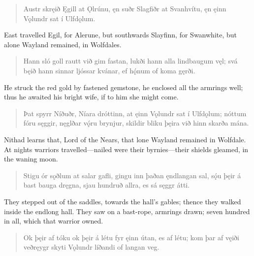 \begin{verse}
\bva Austr skręið Ęgill \hld at Ǫlrúnu,
ęn suðr Slagfiðr \hld at Svanhvítu,
ęn ęinn Vǫlundr \hld sat í Ulfdǫlum. \\%
\end{verse}

\bvb East travelled Egil, for Alerune, but southwards Slayfinn, for Swanwhite, but alone Wayland remained, in Wolfdales. \\

\begin{verse}
\bva Hann sló goll rautt \hld við gim fastan,
lukði hann alla \hld lindbaugum vęl;
svá bęið hann \hld sinnar ljóssar
kvánar, ef hǫ́num \hld of koma gęrði. \\%
\end{verse}

\bvb He struck the red gold by fastened gemstone, he enclosed all the armrings well; thus he awaited his bright wife, if to him she might come. \\

\begin{verse}
\bva Þat spyrr Níðuðr, \hld Níara dróttinn,
at ęinn Vǫlundr \hld sat í Ulfdǫlum;
nóttum fóru sęggir, \hld nęglðar vǫ́ru brynjur,
skildir bliku þęira \hld við hinn skarða mána. \\%
\end{verse}

\bvb Nithad learns that, Lord of the Nears, that lone Wayland remained in Wolfdale. At nights warriors travelled—nailed were their byrnies—their shields gleamed, in the waning moon. \\

\begin{verse}
\bva Stigu ór sǫðlum \hld at salar gafli,
gingu inn þaðan \hld ęndlangan sal,
sǫ́u þęir á bast \hld bauga dręgna,
sjau hundruð allra, \hld es sá sęggr átti. \\%
\end{verse}

\bvb They stepped out of the saddles, towards the hall's gables; thence they walked inside the endlong hall. They saw on a bast-rope, armrings drawn; seven hundred in all, which that warrior owned. \\

\begin{verse}
\bva Ok þęir af tóku \hld ok þęir á létu
fyr ęinn útan, \hld es af létu;
kom þar af vęiði \hld veðręygr skyti
Vǫlundr líðandi \hld of langan veg. \\%
\end{verse}

